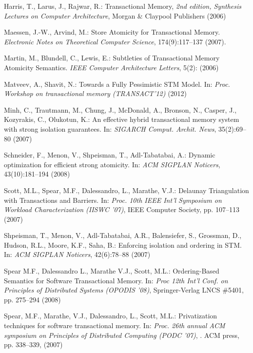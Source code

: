 \begin{thebibliography}{99}
{
 Harris, T.,  Larus, J.,  Rajwar, R.:
Transactional Memory, 
{\it 2nd edition, Synthesis Lectures on Computer Architecture},
Morgan \& Claypool Publishers (2006)




 Maessen, J.-W., Arvind, M.:
 Store Atomicity for Transactional Memory. 
{\it Electronic  Notes  on Theoretical  Computer Science}, 
174(9):117--137 (2007).

 Martin, M.,  Blundell, C., Lewis, E.:
 Subtleties of Transactional Memory Atomicity Semantics. 
{\it IEEE Computer Architecture  Letters},  5(2):  (2006)

Matveev, A.,  Shavit, N.:
Towards a Fully Pessimistic STM Model. 
In: {\it Proc. Workshop on transactional memory (TRANSACT'12)} (2012)

Minh, C., Trautmann, M., Chung, J., McDonald, A., Bronson, N., Casper, J., Kozyrakis, C., Olukotun, K.:
An effective hybrid transactional memory system with strong isolation guarantees.
In: {\it SIGARCH Comput. Archit. News}, 35(2):69--80 (2007)



 Schneider, F., Menon, V., Shpeisman, T., Adl-Tabatabai, A.:
 Dynamic optimization for efficient strong atomicity.
In: {\it ACM  SIGPLAN Noticers}, 43(10):181--194  (2008)

 Scott, M.L.,  Spear, M.F., Dalessandro, L.,   Marathe, V.J.:
 Delaunay Triangulation with Transactions and Barriers. 
In: {\it Proc.  10th IEEE Int'l Symposium on Workload Characterization (IISWC '07)},
 IEEE Computer Society, pp. 107--113 (2007)



 Shpeisman, T.,  Menon, V.,  Adl-Tabatabai, A.R.,  Balensiefer, S.,  Grossman, D.,
 Hudson, R.L., Moore, K.F., Saha, B.:
Enforcing isolation and ordering in STM. 
In: {\it ACM  SIGPLAN Noticers}, 42(6):78--88  (2007)

Spear M.F.,  Dalessandro L.,  Marathe V.J.,  Scott, M.L.:
Ordering-Based Semantics for Software Transactional Memory. 
In: {\it Proc  12th Int'l Conf. on Principles of Distributed Systems 
(OPODIS '08)},  Springer-Verlag LNCS \#5401, pp. 275--294 (2008) 

Spear, M.F.,  Marathe, V.J.,  Dalessandro, L.,  Scott, M.L.: 
Privatization techniques for software transactional memory. 
In: {\it Proc. 26th  annual ACM symposium on Principles of Distributed Computing 
(PODC '07)}, . ACM press, pp.  338--339, (2007)


}
\end{thebibliography}

